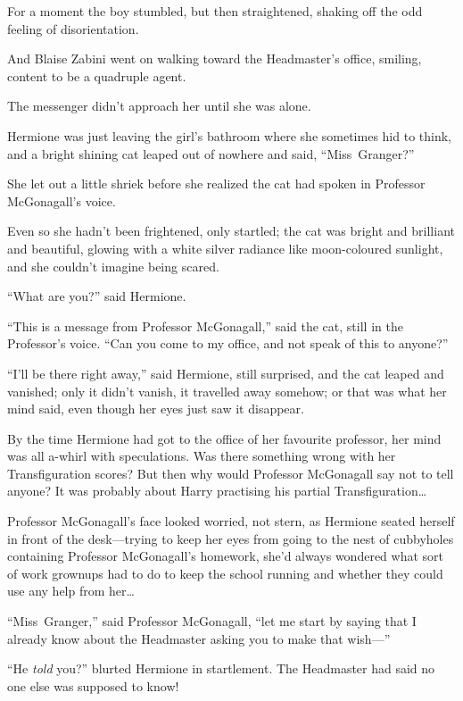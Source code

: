 For a moment the boy stumbled, but then straightened, shaking off the odd
feeling of disorientation.

And Blaise Zabini went on walking toward the Headmaster’s office, smiling,
content to be a quadruple agent.

The messenger didn’t approach her until she was alone.

Hermione was just leaving the girl’s bathroom where she sometimes hid to think,
and a bright shining cat leaped out of nowhere and said, “Miss~Granger?”

She let out a little shriek before she realized the cat had spoken in Professor
McGonagall’s voice.

Even so she hadn’t been frightened, only startled; the cat was bright and
brilliant and beautiful, glowing with a white silver radiance like moon-coloured
sunlight, and she couldn’t imagine being scared.

“What are you?” said Hermione.

“This is a message from Professor McGonagall,” said the cat, still in the
Professor’s voice. “Can you come to my office, and not speak of this to anyone?”

“I’ll be there right away,” said Hermione, still surprised, and the cat leaped
and vanished; only it didn’t vanish, it travelled away somehow; or that was what
her mind said, even though her eyes just saw it disappear.

By the time Hermione had got to the office of her favourite professor, her mind
was all a-whirl with speculations. Was there something wrong with her
Transfiguration scores? But then why would Professor McGonagall say not to tell
anyone? It was probably about Harry practising his partial
Transfiguration…

Professor McGonagall’s face looked worried, not stern, as Hermione seated
herself in front of the desk—trying to keep her eyes from going to the nest
of cubbyholes containing Professor McGonagall’s homework, she’d always wondered
what sort of work grownups had to do to keep the school running and whether
they could use any help from her…

“Miss~Granger,” said Professor McGonagall, “let me start by saying that I
already know about the Headmaster asking you to make that wish—”

“He \emph{told} you?” blurted Hermione in startlement. The Headmaster had said
no one else was supposed to know!

